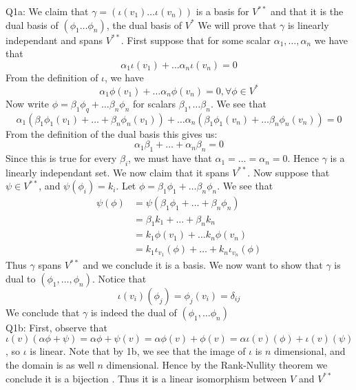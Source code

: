 \documentclass[letterpaper]{article}
\begin{document}
\noindent Q1a: We claim that $\gamma = (\iota(v_1)\dots \iota(v_n))$ is a basis for $V^{**}$ and that it is the dual basis of $(\phi_1\dots \phi_n)$, the dual basis of $V^*$
We will prove that $\gamma$ is linearly independant and spans $V^{**}$. First suppose that for some scalar $\alpha_1,\dots, \alpha_n$ we have that $$\alpha_1 \iota(v_1)+ \dots \alpha_n \iota(v_n)=0$$
From the definition of $\iota$, we have $$\alpha_1 \phi(v_1) + \dots \alpha_n \phi(v_n)=0 , \forall \phi\in V^*$$ 
Now write $\phi = \beta_1 \phi_q + \dots \beta_n \phi_n$ for scalars $\beta_1,\dots \beta_n$. We see that $$\alpha_1(\beta_1\phi_1(v_1)+\dots + \beta_n\phi_n(v_1))+ \dots \alpha_n(\beta_1\phi_1(v_n)+\dots \beta_n \phi_n(v_n)) = 0$$
From the definition of the dual basis this gives us: $$\alpha_1\beta_1 + \dots + \alpha_n \beta_n = 0$$ Since this is true for every $\beta_i$, we must have that $\alpha_1=\dots = \alpha_n =0$. Hence $\gamma$ is a linearly independant set. We now claim that it spans $V^{**}$.
Now suppose that $\psi \in V^{**}$, and $\psi(\phi_i) = k_i$. Let $\phi= \beta_1 \phi_1 + \dots \beta_n \phi_n$. 
We see that 
\begin{align*}
    \psi(\phi) & = \psi(\beta_1 \phi_1 + \dots + \beta_n \phi_n)
    \\ & = \beta_1 k_1 + \dots + \beta_n k_n
    \\ & = k_1 \phi(v_1) + \dots k_n \phi(v_n)
    \\ & = k_1 \iota_{v_1}(\phi) + \dots + k_n \iota_{v_n}(\phi)
\end{align*} Thus $\gamma$ spans $V^{**}$ and we conclude it is a basis. 
We now want to show that $\gamma$ is dual to $(\phi_1, \dots ,\phi_n)$. Notice that 
$$\iota(v_i)(\phi_j) = \phi_j(v_i) = \delta_{ij}$$
We conclude that $\gamma$ is indeed the dual of $(\phi_1,\dots \phi_n)$
\newline \\ Q1b: First, observe that $\iota(v)(\alpha\phi + \psi) = \alpha\phi + \psi(v) = \alpha\phi(v) + \phi(v) = \alpha \iota(v)(\phi) + \iota(v)(\psi)$, so $\iota$ is linear. 
Note that by 1b, we see that the image of $\iota$ is $n$ dimensional, and the domain is as well $n$ dimensional. Hence by the Rank-Nullity theorem we conclude it is a bijection . Thus it is a linear isomorphism between $V$ and $V^{**}$
\end{document}
